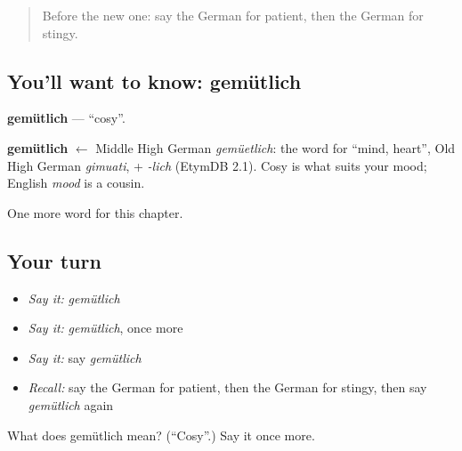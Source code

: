 \label{lesson:GE-C214-gemuetlich}



\begin{quote}
Before the new one: say the German for patient, then the German for stingy.
\end{quote}

\subsection*{You'll want to know: gemütlich}
\textbf{gemütlich} — \textquotedblleft{}cosy\textquotedblright{}.

\begin{cousinweb}
\textbf{gemütlich} $\leftarrow$ Middle High German \emph{gemüetlich}: the word for \textquotedblleft{}mind, heart\textquotedblright{}, Old High German \emph{gimuati}, + \emph{-lich} (EtymDB 2.1). Cosy is what suits your mood; English \emph{mood} is a cousin.
\end{cousinweb}

\begin{grammarlens}[title={What you've built}]
One more word for this chapter.
\end{grammarlens}

\subsection*{Your turn}
\begin{itemize}
\raggedright
  \item \emph{Say it:} \emph{gemütlich}
  \item \emph{Say it:} \emph{gemütlich}, once more
  \item \emph{Say it:} say \emph{gemütlich}
  \item \emph{Recall:} say the German for patient, then the German for stingy, then say \emph{gemütlich} again
\end{itemize}

\begin{tcolorbox}[breakable,colback=teal!4,colframe=teal!35!black,title={Before you move on}]
What does gemütlich mean? (\textquotedblleft{}Cosy\textquotedblright{}.) Say it once more.
\end{tcolorbox}
